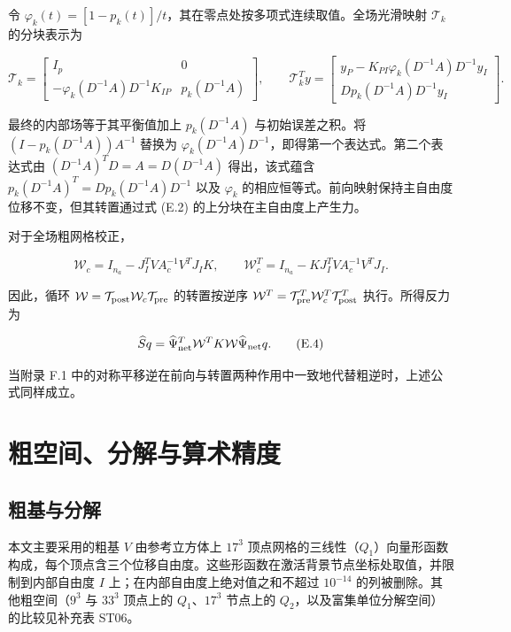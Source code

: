 \documentclass[preprint,12pt,authoryear]{elsarticle}
\begin{document}
令 \(\varphi_k(t)=[1-p_k(t)]/t\)，其在零点处按多项式连续取值。全场光滑映射 \(\mathcal T_k\) 的分块表示为

\[
\mathcal T_k=
\begin{bmatrix}
I_p&0\\
-\varphi_k(D^{-1}A)D^{-1}K_{IP}&p_k(D^{-1}A)
\end{bmatrix},\qquad
\mathcal T_k^Ty=
\begin{bmatrix}
y_P-K_{PI}\varphi_k(D^{-1}A)D^{-1}y_I\\
D p_k(D^{-1}A)D^{-1}y_I
\end{bmatrix}.
\tag{E.2}
\]

最终的内部场等于其平衡值加上 \(p_k(D^{-1}A)\) 与初始误差之积。将 \((I-p_k(D^{-1}A))A^{-1}\) 替换为 \(\varphi_k(D^{-1}A)D^{-1}\)，即得第一个表达式。第二个表达式由 \((D^{-1}A)^TD=A=D(D^{-1}A)\) 得出，该式蕴含 \(p_k(D^{-1}A)^T=Dp_k(D^{-1}A)D^{-1}\) 以及 \(\varphi_k\) 的相应恒等式。前向映射保持主自由度位移不变，但其转置通过式 (E.2) 的上分块在主自由度上产生力。

对于全场粗网格校正，

\[
\mathcal W_c=I_{n_a}-J_I^TVA_c^{-1}V^TJ_IK,
\qquad
\mathcal W_c^T=I_{n_a}-KJ_I^TVA_c^{-1}V^TJ_I.
\tag{E.3}
\]

因此，循环 \(\mathcal W=\mathcal T_{\rm post}\mathcal W_c\mathcal T_{\rm pre}\) 的转置按逆序 \(\mathcal W^T=\mathcal T_{\rm pre}^T\mathcal W_c^T\mathcal T_{\rm post}^T\) 执行。所得反力为

\[
\widehat S q=\widehat\Psi_{\rm net}^T\mathcal W^TK\mathcal W\widehat\Psi_{\rm net} q.
\tag{E.4}
\]

当附录 F.1 中的对称平移逆在前向与转置两种作用中一致地代替粗逆时，上述公式同样成立。

\section{粗空间、分解与算术精度}

\subsection{粗基与分解}

本文主要采用的粗基 \(V\) 由参考立方体上 \(17^3\) 顶点网格的三线性（\(Q_1\)）向量形函数构成，每个顶点含三个位移自由度。这些形函数在激活背景节点坐标处取值，并限制到内部自由度 \(I\) 上；在内部自由度上绝对值之和不超过 \(10^{-14}\) 的列被删除。其他粗空间（\(9^3\) 与 \(33^3\) 顶点上的 \(Q_1\)、\(17^3\) 节点上的 \(Q_2\)，以及富集单位分解空间）的比较见补充表 ST06。
\end{document}
